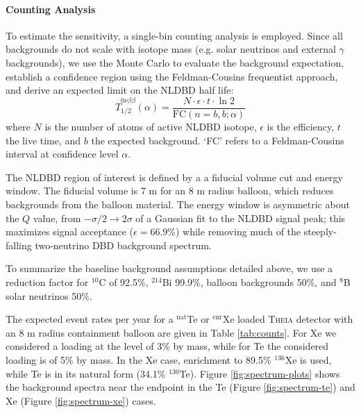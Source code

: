 \paragraph{Counting Analysis}
To estimate the sensitivity, a single-bin counting analysis is employed. Since
all backgrounds do not scale with isotope mass (e.g. solar neutrinos
and external $\gamma$ backgrounds), we use the Monte Carlo to evaluate the
background expectation, establish a confidence region using the Feldman-Cousins
frequentist approach, and derive an expected limit on the NLDBD half life:
\begin{equation}
\label{eq:sens}
\widehat{T}_{1/2}^{0\nu\beta\beta}(\alpha) = 
\frac{N\cdot \epsilon \cdot t \cdot \ln 2}{\mathrm{FC}(n=b, b; \alpha)}
\end{equation}
where $N$ is the number of atoms of active NLDBD isotope, $\epsilon$ is the
efficiency, $t$ the live time, and $b$ the expected background.
`FC' refers to a Feldman-Cousins interval at confidence level
$\alpha$.

The NLDBD region of interest is defined by a a fiducial volume cut and
energy window. The fiducial volume is 7 m for an 8 m radius balloon, which
reduces backgrounds from the balloon material. The energy window is asymmetric
about the $Q$ value, from $-\sigma/2 \to 2\sigma$ of a Gaussian fit to the
NLDBD signal peak; this maximizes signal acceptance ($\epsilon=66.9$\%)
while removing much of the steeply-falling two-neutrino DBD background
spectrum.

To summarize the baseline background assumptions detailed above,
we use a reduction
factor for $^{10}$C of 92.5\%, $^{214}$Bi 99.9\%, balloon backgrounds 50\%,
and $^8$B solar neutrinos 50\%.

The expected event rates per year for a $^\mathrm{nat}$Te or
$^\mathrm{enr}$Xe loaded \textsc{Theia}
detector with an 8 m radius containment balloon are given in Table
\ref{tab:counts}. For Xe we considered a loading at the level of 3\% by mass, while for Te the considered loading is of 5\% by mass.
In the Xe case, enrichment to 89.5\% $^{136}$Xe is used, while Te is in its
natural form (34.1\% $^{130}$Te). Figure \ref{fig:spectrum-plots} shows
the background spectra near the endpoint in the
Te (Figure \ref{fig:spectrum-te}) and Xe (Figure \ref{fig:spectrum-xe}) cases.

